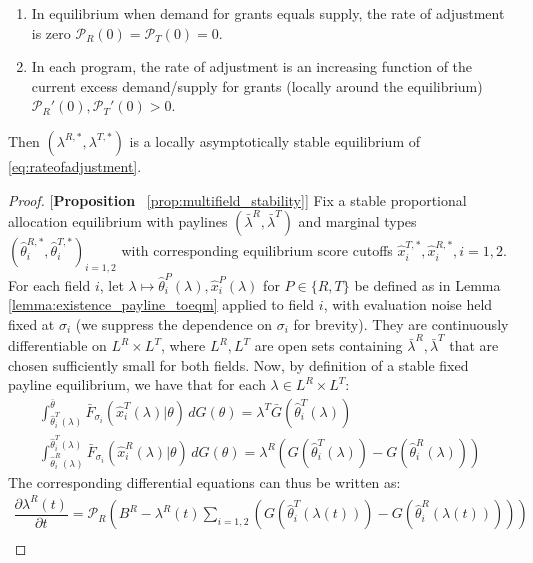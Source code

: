 \begin{proposition}
\vspace{-5pt}
\begin{enumerate}[label=(\arabic*),ref=\theproposition(\arabic*)]
   \item In equilibrium when demand for grants equals supply, the rate of adjustment is zero $\mathcal{P}_R(0)=\mathcal{P}_T(0)=0$. 
   \item In each program, the rate of adjustment is an increasing function of the current excess demand/supply for grants (locally around the equilibrium) $\mathcal{P}_R'(0),\mathcal{P}_T'(0)>0$. 
\end{enumerate} 
Then $(\lambda^{R,*}, \lambda^{T,*})$ is a locally asymptotically stable equilibrium of \eqref{eq:rateofadjustment}. 
\end{proposition}


\begin{proof}{[\textbf{Proposition} ~\ref{prop:multifield_stability}]}
Fix a stable proportional allocation equilibrium with paylines $(\bar{\lambda}^{R},\bar{\lambda}^{T})$ and marginal types $(\hat{\theta}^{R,*}_i, \hat{\theta}^{T,*}_i)_{i=1,2}$ with corresponding equilibrium score cutoffs $\hat{x}^{T,*}_i,\hat{x}^{R,*}_i, i=1,2$. For each field $i$, let $\lambda\mapsto \hat{\theta}^P_i(\lambda),\hat{x}^P_i(\lambda)$ for $P\in \{R,T\}$ be defined as in Lemma \ref{lemma:existence_payline_toeqm} applied to field $i$, with evaluation noise held fixed at $\sigma_i$ (we suppress the dependence on $\sigma_i$ for brevity). They are continuously differentiable on $L^R\times L^T$, where $L^R,L^T$ are open sets containing $\bar{\lambda}^R,\bar{\lambda}^T$ that are chosen sufficiently small for both fields. Now, by definition of a stable fixed payline equilibrium, we have that for each $\lambda\in L^R\times L^T$:
\begin{gather*}
  \int_{\hat{\theta}_i^{T}(\lambda)}^{\bar{\theta}}\bar{F}_{\sigma_i}(\hat{x}^{T}_i(\lambda)|\theta) \,dG(\theta) = \lambda^T\bar{G}(\hat{\theta}^T_i(\lambda)) \\ 
  \int_{\hat{\theta}_i^{R}(\lambda)}^{\hat{\theta}_i^{T}(\lambda)}\bar{F}_{\sigma_i}(\hat{x}^{R}_i(\lambda)|\theta) \,dG(\theta) = \lambda^R(G(\hat{\theta}^{T}_i(\lambda)) - G(\hat{\theta}^{R}_i(\lambda)))
\end{gather*}
The corresponding differential equations can thus be written as:
\begin{gather*}
  \dfrac{\partial \lambda^R(t)}{\partial t} = \mathcal{P}_R\left(B^R -  \lambda^R(t)\sum_{i=1,2}(G(\hat{\theta}^{T}_i(\lambda(t))) - G(\hat{\theta}^{R}_i(\lambda(t))))\right) \\ 

\end{gather*}
\end{proof}
